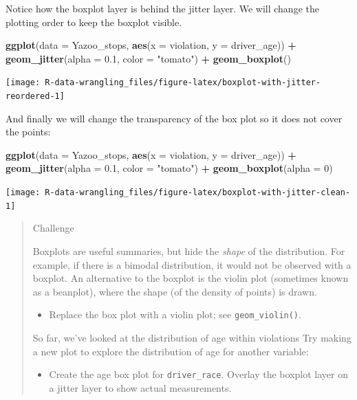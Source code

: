 \documentclass[]{book}
\newenvironment{Shaded}{\begin{snugshade}}{\end{snugshade}}
\newcommand{\DataTypeTok}[1]{\textcolor[rgb]{0.13,0.29,0.53}{#1}}
\newcommand{\DecValTok}[1]{\textcolor[rgb]{0.00,0.00,0.81}{#1}}
\newcommand{\FloatTok}[1]{\textcolor[rgb]{0.00,0.00,0.81}{#1}}
\newcommand{\KeywordTok}[1]{\textcolor[rgb]{0.13,0.29,0.53}{\textbf{#1}}}
\newcommand{\NormalTok}[1]{#1}
\newcommand{\OperatorTok}[1]{\textcolor[rgb]{0.81,0.36,0.00}{\textbf{#1}}}
\newcommand{\StringTok}[1]{\textcolor[rgb]{0.31,0.60,0.02}{#1}}
\providecommand{\tightlist}{%
  \setlength{\itemsep}{0pt}\setlength{\parskip}{0pt}}
\begin{document}
Notice how the boxplot layer is behind the jitter layer. We will change the plotting order to keep the boxplot visible.

\begin{Shaded}
\begin{Highlighting}[]
\KeywordTok{ggplot}\NormalTok{(}\DataTypeTok{data =}\NormalTok{ Yazoo_stops, }\KeywordTok{aes}\NormalTok{(}\DataTypeTok{x =}\NormalTok{ violation, }\DataTypeTok{y =}\NormalTok{ driver_age)) }\OperatorTok{+}
\StringTok{    }\KeywordTok{geom_jitter}\NormalTok{(}\DataTypeTok{alpha =} \FloatTok{0.1}\NormalTok{, }\DataTypeTok{color =} \StringTok{"tomato"}\NormalTok{) }\OperatorTok{+}\StringTok{ }
\StringTok{    }\KeywordTok{geom_boxplot}\NormalTok{()}
\end{Highlighting}
\end{Shaded}

\texttt{[image: R-data-wrangling\_files/figure-latex/boxplot-with-jitter-reordered-1]}

And finally we will change the transparency of the box plot so it does not cover the points:

\begin{Shaded}
\begin{Highlighting}[]
\KeywordTok{ggplot}\NormalTok{(}\DataTypeTok{data =}\NormalTok{ Yazoo_stops, }\KeywordTok{aes}\NormalTok{(}\DataTypeTok{x =}\NormalTok{ violation, }\DataTypeTok{y =}\NormalTok{ driver_age)) }\OperatorTok{+}
\StringTok{    }\KeywordTok{geom_jitter}\NormalTok{(}\DataTypeTok{alpha =} \FloatTok{0.1}\NormalTok{, }\DataTypeTok{color =} \StringTok{"tomato"}\NormalTok{) }\OperatorTok{+}
\StringTok{    }\KeywordTok{geom_boxplot}\NormalTok{(}\DataTypeTok{alpha =} \DecValTok{0}\NormalTok{)  }
\end{Highlighting}
\end{Shaded}

\texttt{[image: R-data-wrangling\_files/figure-latex/boxplot-with-jitter-clean-1]}

\begin{quote}
Challenge

Boxplots are useful summaries, but hide the \emph{shape} of the distribution. For
example, if there is a bimodal distribution, it would not be observed with a
boxplot. An alternative to the boxplot is the violin plot (sometimes known as a
beanplot), where the shape (of the density of points) is drawn.

\begin{itemize}
\tightlist
\item
  Replace the box plot with a violin plot; see \texttt{geom\_violin()}.
\end{itemize}

So far, we've looked at the distribution of age within violations Try making a
new plot to explore the distribution of age for another variable:

\begin{itemize}
\tightlist
\item
  Create the age box plot for \texttt{driver\_race}. Overlay the boxplot layer on a jitter layer to show actual measurements.
\end{itemize}
\end{quote}
\end{document}
